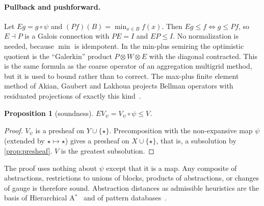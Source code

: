 \documentclass[11pt]{article}
\newtheorem{proposition}[theorem]{Proposition}
\theoremstyle{definition}
\theoremstyle{remark}
\newcommand{\tgt}{\star}
\begin{document}
\paragraph{Pullback and pushforward.}
Let $E g = g \circ \psi$ and $(Pf)(B) = \min_{x \in B} f(x)$. Then
$Eg \le f \iff g \le Pf$, so $E \dashv P$ is a Galois connection with $PE = I$
and $EP \le I$. No normalization is needed, because $\min$ is idempotent. In the
min-plus semiring the optimistic quotient is the ``Galerkin'' product
$P \otimes W \otimes E$ with the diagonal contracted. This is the same formula as
the coarse operator of an aggregation multigrid method, but it is used to bound
rather than to correct. The max-plus finite element method of Akian, Gaubert and
Lakhoua projects Bellman operators with residuated projections of exactly this
kind~\cite{akian2008,cohen2004}.

\begin{proposition}[soundness]\label{prop:lower}
$E V_\psi = V_\psi \circ \psi \le V$.
\end{proposition}
\begin{proof}
$V_\psi$ is a presheaf on $Y \cup \{\tgt\}$. Precomposition with the non-expansive
map $\psi$ (extended by $\tgt \mapsto \tgt$) gives a presheaf on
$X \cup \{\tgt\}$, that is, a subsolution by \cref{prop:presheaf}. $V$ is the
greatest subsolution.
\end{proof}

The proof uses nothing about $\psi$ except that it is a map. Any composite of
abstractions, restrictions to unions of blocks, products of abstractions, or
changes of gauge is therefore sound. Abstraction distances as admissible
heuristics are the basis of Hierarchical A$^*$~\cite{holte1996} and of pattern
databases~\cite{culberson1998}.
\end{document}
